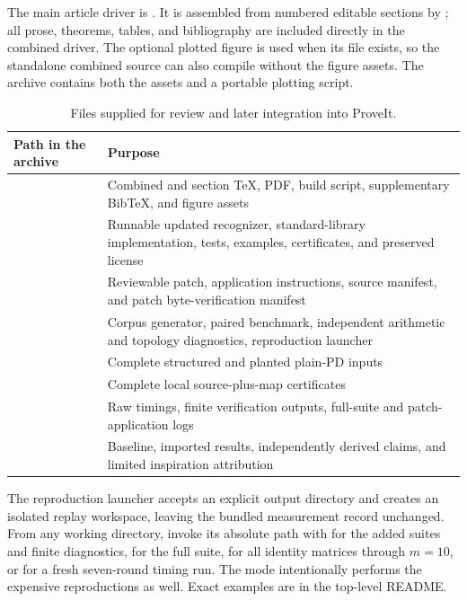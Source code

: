 The main article driver is
. It is assembled from
numbered editable sections by ; all prose,
theorems, tables, and bibliography are included directly in the combined
driver. The optional plotted figure is used when its file exists, so
the standalone combined source can also compile without the figure assets.
The archive contains both the assets and a portable plotting script.

\begin{table}[htbp]
\centering\small
\begin{tabularx}{\textwidth}{L{0.41\textwidth}X}
\toprule
Path in the archive & Purpose\\
\midrule
{} & Combined and section TeX, PDF, build script,
supplementary BibTeX, and figure assets\\
 & Runnable updated recognizer, standard-library implementation,
tests, examples, certificates, and preserved license\\
 & Reviewable patch, application instructions, source
manifest, and patch byte-verification manifest\\
 & Corpus generator, paired benchmark,
independent arithmetic and topology diagnostics, reproduction launcher\\
 & Complete structured and planted plain-PD inputs\\
 & Complete local source-plus-map certificates\\
 & Raw timings, finite verification outputs, full-suite
and patch-application logs\\
 & Baseline, imported results,
independently derived claims, and limited inspiration attribution\\
\bottomrule
\end{tabularx}
\caption{Files supplied for review and later integration into ProveIt.}
\end{table}

The reproduction launcher accepts an explicit output directory and creates
an isolated replay workspace, leaving the bundled measurement record
unchanged. From any working directory, invoke its absolute path with
 for the added suites and finite diagnostics,
 for the full suite,  for all identity
matrices through \(m=10\), or  for a fresh seven-round
timing run. The  mode intentionally performs the expensive
reproductions as well. Exact examples are in the top-level README.


